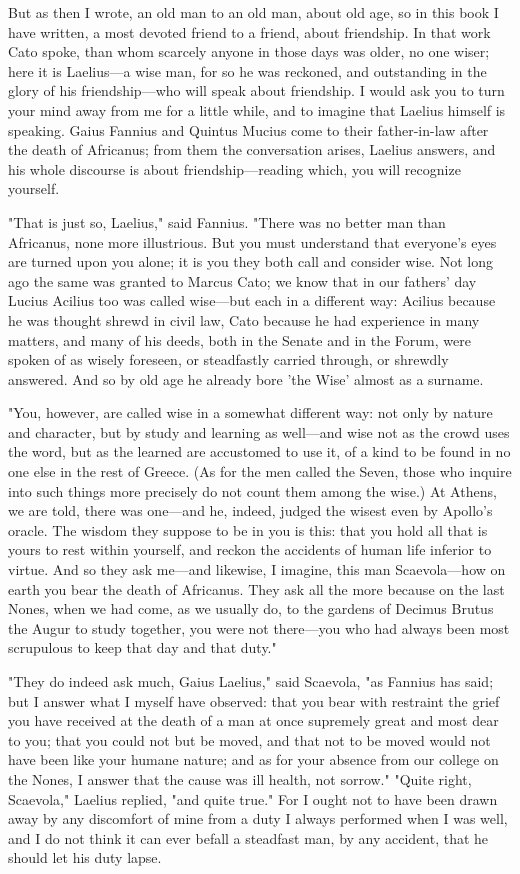  But as then I wrote, an old man to an old man, about old age, so in this book I have written, a most devoted friend to a friend, about friendship. In that work Cato spoke, than whom scarcely anyone in those days was older, no one wiser; here it is Laelius—a wise man, for so he was reckoned, and outstanding in the glory of his friendship—who will speak about friendship. I would ask you to turn your mind away from me for a little while, and to imagine that Laelius himself is speaking. Gaius Fannius and Quintus Mucius come to their father-in-law after the death of Africanus; from them the conversation arises, Laelius answers, and his whole discourse is about friendship—reading which, you will recognize yourself.

 "That is just so, Laelius," said Fannius. "There was no better man than Africanus, none more illustrious. But you must understand that everyone's eyes are turned upon you alone; it is you they both call and consider wise. Not long ago the same was granted to Marcus Cato; we know that in our fathers' day Lucius Acilius too was called wise—but each in a different way: Acilius because he was thought shrewd in civil law, Cato because he had experience in many matters, and many of his deeds, both in the Senate and in the Forum, were spoken of as wisely foreseen, or steadfastly carried through, or shrewdly answered. And so by old age he already bore 'the Wise' almost as a surname.

 "You, however, are called wise in a somewhat different way: not only by nature and character, but by study and learning as well—and wise not as the crowd uses the word, but as the learned are accustomed to use it, of a kind to be found in no one else in the rest of Greece. (As for the men called the Seven, those who inquire into such things more precisely do not count them among the wise.) At Athens, we are told, there was one—and he, indeed, judged the wisest even by Apollo's oracle. The wisdom they suppose to be in you is this: that you hold all that is yours to rest within yourself, and reckon the accidents of human life inferior to virtue. And so they ask me—and likewise, I imagine, this man Scaevola—how on earth you bear the death of Africanus. They ask all the more because on the last Nones, when we had come, as we usually do, to the gardens of Decimus Brutus the Augur to study together, you were not there—you who had always been most scrupulous to keep that day and that duty."

 "They do indeed ask much, Gaius Laelius," said Scaevola, "as Fannius has said; but I answer what I myself have observed: that you bear with restraint the grief you have received at the death of a man at once supremely great and most dear to you; that you could not but be moved, and that not to be moved would not have been like your humane nature; and as for your absence from our college on the Nones, I answer that the cause was ill health, not sorrow." "Quite right, Scaevola," Laelius replied, "and quite true." For I ought not to have been drawn away by any discomfort of mine from a duty I always performed when I was well, and I do not think it can ever befall a steadfast man, by any accident, that he should let his duty lapse.

